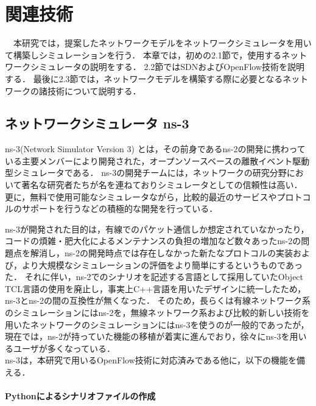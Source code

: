 \chapter{関連技術}

　本研究では，提案したネットワークモデルをネットワークシミュレータを用いて構築しシミュレーションを行う．
本章では，初めの2.1節で，使用するネットワークシミュレータの説明をする．
2.2節ではSDNおよびOpenFlow技術を説明する．
最後に2.3節では，ネットワークモデルを構築する際に必要となるネットワークの諸技術について説明する．

\section{ネットワークシミュレータ ns-3}

ns-3(Network Simulator Version 3)\cite{ns3} \cite{ns3text} とは，その前身であるns-2の開発に携わっている主要メンバーにより開発された，オープンソースベースの離散イベント駆動型シミュレータである．
ns-3の開発チームには，ネットワークの研究分野において著名な研究者たちが名を連ねておりシミュレータとしての信頼性は高い．
更に，無料で使用可能なシミュレータながら，比較的最近のサービスやプロトコルのサポートを行うなどの積極的な開発を行っている．

ns-3が開発された目的は，有線でのパケット通信しか想定されていなかったり，コードの煩雑・肥大化によるメンテナンスの負担の増加など数々あったns-2の問題点を解消し，ns-2の開発時点では存在しなかった新たなプロトコルの実装および，より大規模なシミュレーションの評価をより簡単にするというものであった．
それに伴い，ns-2でのシナリオを記述する言語として採用していたObject TCL言語の使用を廃止し，事実上C++言語を用いたデザインに統一したため，ns-3とns-2の間の互換性が無くなった．
そのため，長らくは有線ネットワーク系のシミュレーションにはns-2を，無線ネットワーク系および比較的新しい技術を用いたネットワークのシミュレーションにはns-3を使うのが一般的であったが，現在では，ns-2が持っていた機能の移植が着実に進んでおり，徐々にns-3を用いるユーザが多くなっている． \\

ns-3は，本研究で用いるOpenFlow技術に対応済みである他に，以下の機能を備える．

\subsubsection{Pythonによるシナリオファイルの作成}

